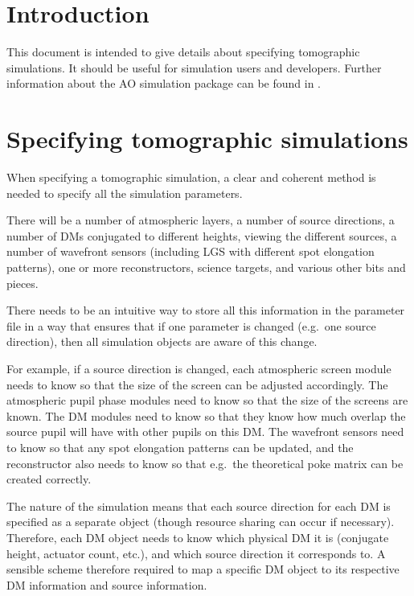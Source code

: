 \documentclass{article}
\begin{document}

\renewcommand{\esotitle}{Preparing tomographic simulations}
\renewcommand{\esodocno}{AOSIM-TOM-UoD-001}

\section{Introduction}
This document is intended to give details about specifying tomographic
simulations.  It should be useful for simulation users and developers.
Further information about the AO simulation package can be found in
\citet{overview}.

\section{Specifying tomographic simulations}
When specifying a tomographic simulation, a clear and coherent method
is needed to specify all the simulation parameters.

There will be a number of atmospheric layers, a number of source
directions, a number of DMs conjugated to different heights, viewing
the different sources, a number of wavefront sensors (including LGS
with different spot elongation patterns), one or more reconstructors,
science targets, and various other bits and pieces.

There needs to be an intuitive way to store all this information in
the parameter file in a way that ensures that if one parameter is
changed (e.g.\ one source direction), then all simulation objects are
aware of this change.

For example, if a source direction is changed, each atmospheric screen
module needs to know so that the size of the screen can be adjusted
accordingly.  The atmospheric pupil phase modules need to know so that
the size of the screens are known.  The DM modules need to know so
that they know how much overlap the source pupil will have with other
pupils on this DM.  The wavefront sensors need to know so that any
spot elongation patterns can be updated, and the reconstructor also
needs to know so that e.g.\ the theoretical poke matrix can be created
correctly.  

The nature of the simulation means that each source direction for each
DM is specified as a separate object (though resource sharing can
occur if necessary).  Therefore, each DM object needs to know which
physical DM it is (conjugate height, actuator count, etc.), and which
source direction it corresponds to.  A sensible scheme therefore
required to map a specific DM object to its respective DM information
and source information.  
\end{document}
